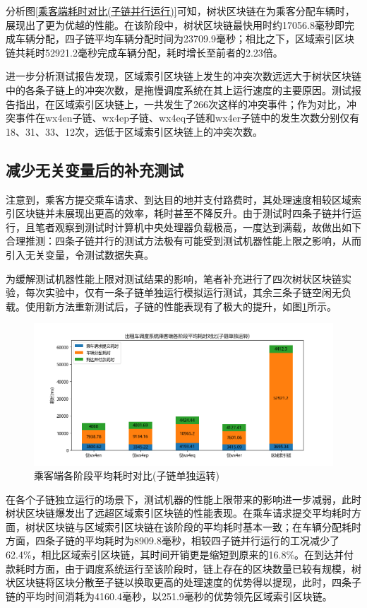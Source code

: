 分析图\ref{乘客端耗时对比(子链并行运行)}可知，树状区块链在为乘客分配车辆时，展现出了更为优越的性能。在该阶段中，树状区块链最快用时约17056.8毫秒即完成车辆分配，四子链平均车辆分配时间为23709.9毫秒；相比之下，区域索引区块链共耗时52921.2毫秒完成车辆分配，耗时增长至前者的2.23倍。

进一步分析测试报告发现，区域索引区块链上发生的冲突次数远远大于树状区块链中的各条子链上的冲突次数，是拖慢调度系统在其上运行速度的主要原因。测试报告指出，在区域索引区块链上，一共发生了266次这样的冲突事件；作为对比，冲突事件在wx4en子链、wx4ep子链、wx4eq子链和wx4er子链中的发生次数分别仅有18、31、33、12次，远低于区域索引区块链上的冲突次数。

\subsection{减少无关变量后的补充测试}

注意到，乘客方提交乘车请求、到达目的地并支付路费时，其处理速度相较区域索引区块链并未展现出更高的效率，耗时甚至不降反升。由于测试时四条子链并行运行，且笔者观察到测试时计算机中央处理器负载极高，一度达到满载，故做出如下合理推测：四条子链并行的测试方法极有可能受到测试机器性能上限之影响，从而引入无关变量，令测试数据失真。

为缓解测试机器性能上限对测试结果的影响，笔者补充进行了四次树状区块链实验，每次实验中，仅有一条子链单独运行模拟运行测试，其余三条子链空闲无负载。使用新方法重新测试后，子链的性能表现有了极大的提升，如图\ref{乘客端耗时对比(子链独立运行)}所示。

\begin{figure}[htbp]
    \centering
    \includegraphics[width=\textwidth]{images/乘客端测试-独立.png}
    \caption{乘客端各阶段平均耗时对比(子链单独运转)}\label{乘客端耗时对比(子链独立运行)} %
\end{figure}

在各个子链独立运行的场景下，测试机器的性能上限带来的影响进一步减弱，此时树状区块链爆发出了远超区域索引区块链的性能表现。在乘车请求提交平均耗时方面，树状区块链与区域索引区块链在该阶段的平均耗时基本一致；在车辆分配耗时方面，四条子链的平均耗时为8909.8毫秒，相较四子链并行运行的工况减少了62.4\%，相比区域索引区块链，其时间开销更是缩短到原来的16.8\%。在到达并付款耗时方面，由于调度系统运行至该阶段时，链上存在的区块数量已较有规模，树状区块链将区块分散至子链以换取更高的处理速度的优势得以提现，此时，四条子链的平均时间消耗为4160.4毫秒，以251.9毫秒的优势领先区域索引区块链。

